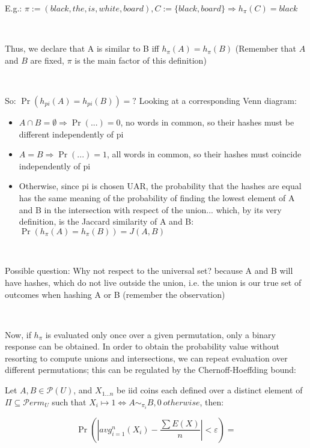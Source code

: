 \documentclass{report}
\begin{document}
	E.g.: $\pi := (black, the, is, white, board), C:=\{black, board\} \Rightarrow h_{\pi}(C) = black$
	
	\
	
	Thus, we declare that A is similar to B iff $h_{\pi}(A)=h_{\pi}(B)$ (Remember that $A$ and $B$ are fixed, $\pi$ is the main factor of this definition)
	
	\
	
	So: $\Pr(h_{pi}(A)=h_{pi}(B)) = ?$ Looking at a corresponding Venn diagram:
	
	\begin{itemize}
	\item $A\cap B = \emptyset \Rightarrow \Pr(...)= 0$, no words in common, so their hashes must be different independently of pi
	\item $A = B \Rightarrow \Pr(...)= 1$, all words in common, so their hashes must coincide independently of pi
	\item Otherwise, since pi is chosen UAR, the probability that the hashes are equal has the same meaning of the probability of finding the lowest element of A and B in the intersection with respect of the union...  which, by its very definition, is the Jaccard similarity of A and B: $\Pr(h_{\pi}(A)=h_{\pi}(B)) = J(A, B)$
	\end{itemize}
	
	\
	
	Possible question: Why not respect to the universal set? because A and B will have hashes, which do not live outside the union, i.e. the union is our true set of outcomes when hashing A or B (remember the observation)
	
	\
	
	Now, if $h_{\pi}$ is evaluated only once over a given permutation, only a binary response can be obtained. In order to obtain the probability value without resorting to compute unions and intersections, we can repeat evaluation over different permutations; this can be regulated by the Chernoff-Hoeffding bound:
	
	Let $A, B \in \mathcal{P}(U)$, and $X_{1 \dots n}$ be iid coins each defined over a distinct element of $\Pi \subseteq \mathcal{P}erm_U$ such that $X_i \mapsto 1 \Leftrightarrow A \sim_{\pi_i} B, 0\ otherwise$, then:
	
	\begin{equation}
	\displaystyle \Pr\left(\left|avg_{i=1}^{n}(X_i) - \frac{\sum E(X)}{n}\right|<\varepsilon\right) = 
	\end{equation}
	
\end{document}

